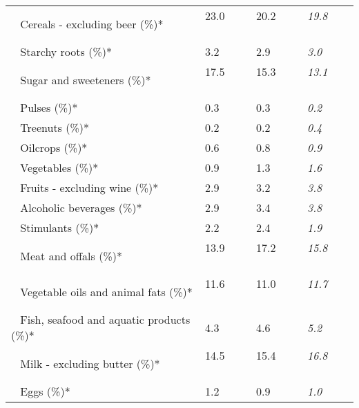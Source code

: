 \begin{tabular}{L{3.9cm} R{1cm} R{1cm} R{1cm}}
	 ~ Cereals - excluding beer (\%)* & 23.0 ~ \ \ & 20.2 ~ \ \ & \textit{19.8} ~ \ \ \\ 
	 ~ Starchy roots (\%)* & 3.2 ~ \ \ & 2.9 ~ \ \ & \textit{3.0} ~ \ \ \\ 
	 ~ Sugar and sweeteners (\%)* & 17.5 ~ \ \ & 15.3 ~ \ \ & \textit{13.1} ~ \ \ \\ 
	 ~ Pulses (\%)* & 0.3 ~ \ \ & 0.3 ~ \ \ & \textit{0.2} ~ \ \ \\ 
	 ~ Treenuts (\%)* & 0.2 ~ \ \ & 0.2 ~ \ \ & \textit{0.4} ~ \ \ \\ 
	 ~ Oilcrops (\%)* & 0.6 ~ \ \ & 0.8 ~ \ \ & \textit{0.9} ~ \ \ \\ 
	 ~ Vegetables (\%)* & 0.9 ~ \ \ & 1.3 ~ \ \ & \textit{1.6} ~ \ \ \\ 
	 ~ Fruits - excluding wine (\%)* & 2.9 ~ \ \ & 3.2 ~ \ \ & \textit{3.8} ~ \ \ \\ 
	 ~ Alcoholic beverages (\%)* & 2.9 ~ \ \ & 3.4 ~ \ \ & \textit{3.8} ~ \ \ \\ 
	 ~ Stimulants (\%)* & 2.2 ~ \ \ & 2.4 ~ \ \ & \textit{1.9} ~ \ \ \\ 
	 ~ Meat and offals (\%)* & 13.9 ~ \ \ & 17.2 ~ \ \ & \textit{15.8} ~ \ \ \\ 
	 ~ Vegetable oils and animal fats (\%)* & 11.6 ~ \ \ & 11.0 ~ \ \ & \textit{11.7} ~ \ \ \\ 
	 ~ Fish, seafood and aquatic products (\%)* & 4.3 ~ \ \ & 4.6 ~ \ \ & \textit{5.2} ~ \ \ \\ 
	 ~ Milk - excluding butter (\%)* & 14.5 ~ \ \ & 15.4 ~ \ \ & \textit{16.8} ~ \ \ \\ 
	 ~ Eggs (\%)* & 1.2 ~ \ \ & 0.9 ~ \ \ & \textit{1.0} ~ \ \ \\ 
       \toprule
      \end{tabular}
      \clearpage
{}
